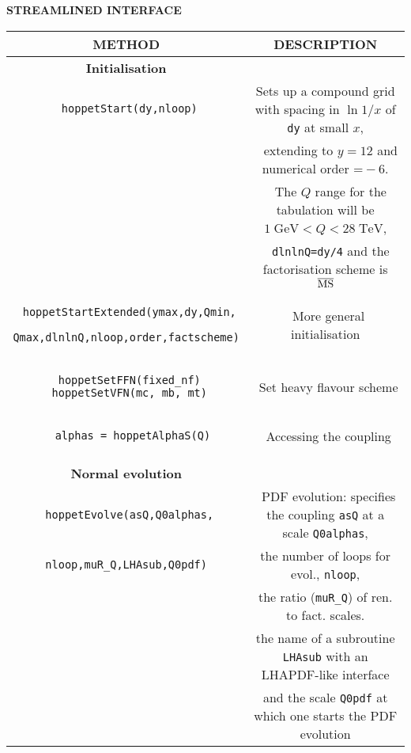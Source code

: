 \documentclass[12pt]{article}
\newcommand{\GeV}{\;\mathrm{GeV}}
\newcommand{\TeV}{\;\mathrm{TeV}}
\newcommand{\ttt}[1]{\texttt{#1}}
\newcommand{\fn}{\scriptsize}
\begin{document}
\begin{table}
\begin{center}
{\bf \large STREAMLINED INTERFACE}
\\
\vspace{0.2cm}
\begin{tabular}{|c|c|}
\hline
\bf METHOD  & \bf DESCRIPTION \\
\hline
\bf Initialisation & \\
\hline
\begin{lstlisting}
 hoppetStart(dy,nloop)
\end{lstlisting} 
& \scriptsize
Sets up a compound grid with
spacing in $\ln 1/x$ of \ttt{dy} at small $x$,\\ &
\fn~  extending to $y = 12$ and numerical
order $\ttt=-6$. \\ & \fn~  The $Q$ range for the tabulation will be $1\GeV <
Q<28 \TeV$, \\
& \fn~ \ttt{dlnlnQ=dy/4} and the factorisation scheme is ${\overline{\rm MS}}$\\
\hline
\begin{lstlisting}
 hoppetStartExtended(ymax,dy,Qmin,
 Qmax,dlnlnQ,nloop,order,factscheme)
\end{lstlisting} & \fn
  ~More general initialisation \\
\hline 
\begin{lstlisting}
 hoppetSetFFN(fixed_nf)
 hoppetSetVFN(mc, mb, mt)
\end{lstlisting} &
\fn ~Set heavy flavour scheme
\\
\hline
\begin{lstlisting}
  alphas = hoppetAlphaS(Q)
\end{lstlisting} &
\fn~Accessing the coupling \\
\hline&\\[-0.5em]
\bf Normal evolution & \\
\hline
\texttt{\footnotesize
 hoppetEvolve(asQ,Q0alphas,}
& \fn\ PDF evolution: specifies the coupling \ttt{asQ} at a 
scale \ttt{Q0alphas}, \\
 \texttt{\footnotesize nloop,muR\_Q,LHAsub,Q0pdf)}&
 \fn the number of loops for  evol., \ttt{nloop}, \\
&\fn the ratio (\ttt{muR\_Q}) of ren. to fact. scales. \\ 
&  \fn the name of a subroutine \ttt{LHAsub} with an LHAPDF-like interface \\
&  \fn and the scale
\ttt{Q0pdf} at which one starts the PDF evolution \\

\end{tabular}
\end{center}
\end{table}
\end{document}
